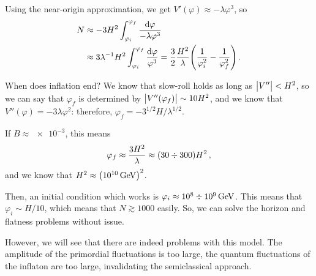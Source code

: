\documentclass[main.tex]{subfiles}
\begin{document}
Using the near-origin approximation, we get \(V'(\varphi ) \approx - \lambda \varphi^3\), so 
%
\begin{align}
N &\approx  - 3 H^2 \int_{\varphi _i}^{\varphi _f} \frac{ \dd{\varphi }}{- \lambda \varphi^3}   \\
&\approx 3 \lambda^{-1} H^2 \int_{\varphi _i}^{\varphi _f} \frac{ \dd{\varphi }}{\varphi^3} = \frac{3}{2} \frac{H^2}{\lambda } \qty( \frac{1}{\varphi _i^2} - \frac{1}{\varphi_f^2})
\,.
\end{align}

When does inflation end?
We know that slow-roll holds as long as \(\abs{V''} < H^2\), so we can say that \(\varphi _f\) is determined by \(\abs{V''(\varphi _f)} \sim 10 H^2\), and we know that \(V''(\varphi ) = - 3 \lambda \varphi^2\): 
therefore, \(\varphi _f = - 3^{1/2} H / \lambda^{1/2}\). 

If \(B \approx \num{e-3}\), this means 
%
\begin{align}
\varphi _f \approx \frac{3 H^2}{\lambda } \approx \qty(30 \divisionsymbol 300) H^2
\,,
\end{align}
%
and we know that \(H^2 \approx \qty(\SI{e10}{GeV})^2\).

Then, an initial condition which works is \(\varphi _i \approx \num{e8} \divisionsymbol \SI{e9}{GeV}\). 
This means that \(\varphi _i \sim H / 10\), which means that \(N \gtrsim 1000\) easily.
So, we can solve the horizon and flatness problems without issue. 

However, we will see that there are indeed problems with this model. 
The amplitude of the primordial fluctuations is too large, the quantum fluctuations of the inflaton are too large, invalidating the semiclassical approach. 
\end{document}
